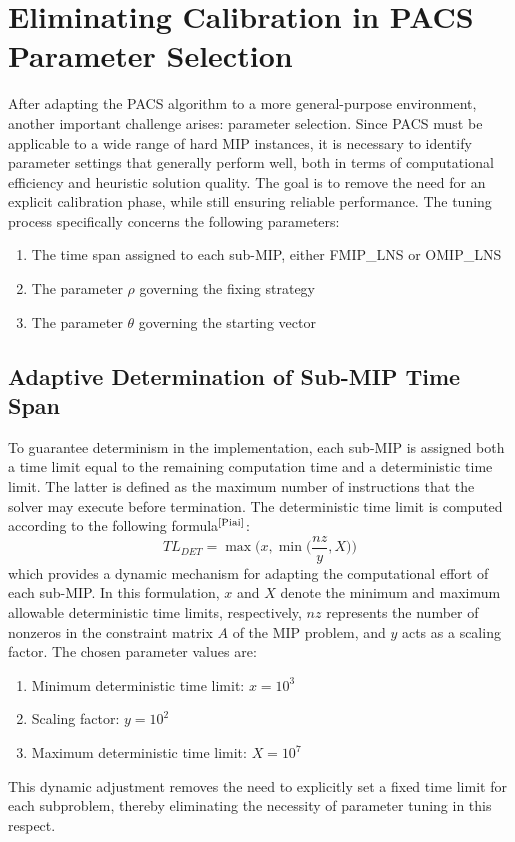 \section{Eliminating Calibration in PACS Parameter Selection}
After adapting the PACS algorithm to a more general-purpose environment, another important challenge arises: parameter selection. Since PACS must be applicable to a wide range of hard MIP instances, it is necessary to identify parameter settings that generally perform well, both in terms of computational efficiency and heuristic solution quality.  
The goal is to remove the need for an explicit calibration phase, while still ensuring reliable performance. The tuning process specifically concerns the following parameters:
\begin{enumerate}
    \item The time span assigned to each sub-MIP, either \textsc{FMIP\_LNS} or \textsc{OMIP\_LNS}
    \item The parameter $\rho$ governing the fixing strategy 
    \item The parameter $\theta$ governing the starting vector
\end{enumerate}

\subsection{Adaptive Determination of Sub-MIP Time Span}
To guarantee determinism in the implementation, each sub-MIP is assigned both a time limit equal to the remaining computation time and a deterministic time limit. The latter is defined as the maximum number of instructions that the solver may execute before termination.  
The deterministic time limit is computed according to the following formula$^\text{\cite{Piai}}$:
\begin{equation}
TL_{DET} = \max\Big(x, \min\Big(\frac{nz}{y}, X\Big)\Big)
\end{equation}
which provides a dynamic mechanism for adapting the computational effort of each sub-MIP.  
In this formulation, $x$ and $X$ denote the minimum and maximum allowable deterministic time limits, respectively, $nz$ represents the number of nonzeros in the constraint matrix $A$ of the MIP problem, and $y$ acts as a scaling factor. The chosen parameter values are:
\begin{enumerate}
\item Minimum deterministic time limit: $x = 10^3$  
\item Scaling factor: $y = 10^2$  
\item Maximum deterministic time limit: $X = 10^7$  
\end{enumerate}
This dynamic adjustment removes the need to explicitly set a fixed time limit for each subproblem, thereby eliminating the necessity of parameter tuning in this respect.

